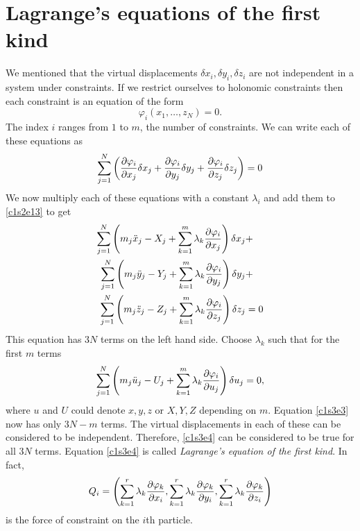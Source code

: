 \section{Lagrange's equations of the first kind}\label{c1s3}
We mentioned that the virtual displacements $\delta x_i, \delta y_i, 
\delta z_i$ are not 
independent in a system under constraints. If we restrict ourselves to
holonomic constraints then each constraint is an equation of the form
\begin{equation}\label{c1s3e1}
\varphi_i(x_1, \ldots, z_N) = 0.
\end{equation}
The index $i$ ranges from $1$ to $m$, the number of constraints. We can
write each of these equations as
\begin{equation}\label{c1s3e2}
\sum_{j=1}^{N}\left(\frac{\partial{\varphi_i}}{\partial{x_j}}\delta x_j 
+ \frac{\partial{\varphi_i}}{\partial{y_j}}\delta y_j
+ \frac{\partial{\varphi_i}}{\partial{z_j}}\delta z_j\right) = 0
\end{equation}
We now multiply each of these equations with a constant $\lambda_i$ and
add them to \eqref{c1s2e13} to get
\begin{align}
\sum_{j=1}^N \left(m_j\ddot{x}_j - X_j + 
\sum_{k=1}^m \lambda_k\frac{\partial{\varphi_i}}{\partial{x_j}} \right)\delta x_j & + \nonumber \\
\sum_{j=1}^N \left(m_j\ddot{y}_j - Y_j + 
\sum_{k=1}^m \lambda_k\frac{\partial{\varphi_i}}{\partial{y_j}} \right)\delta y_j & + \nonumber \\
\sum_{j=1}^N \left(m_j\ddot{z}_j - Z_j + 
\sum_{k=1}^m \lambda_k\frac{\partial{\varphi_i}}{\partial{z_j}} \right)\delta z_j & = 0 \label{c1s3e3}
\end{align}
This equation has $3N$ terms on the left hand side. Choose $\lambda_k$
such that for the first $m$ terms
\begin{equation}\label{c1s3e4}
\sum_{j=1}^N \left(m_j\ddot{u}_j - U_j + 
\sum_{k=1}^m \lambda_k\frac{\partial{\varphi_i}}{\partial{u_j}} \right)\delta u_j = 0,
\end{equation}
where $u$ and $U$ could denote $x, y, z$ or $X, Y, Z$ depending on $m$.
Equation \eqref{c1s3e3} now has only $3N - m$ terms. The virtual displacements
in each of these can be considered to be independent. Therefore, \eqref{c1s3e4}
can be considered to be true for all $3N$ terms. Equation \eqref{c1s3e4} is
called \emph{Lagrange's equation of the first kind}. In fact,
\begin{equation}
Q_i = \left(\sum_{k=1}^r\lambda_k \frac{\partial{\varphi_k}}{\partial{x_i}},
            \sum_{k=1}^r\lambda_k \frac{\partial{\varphi_k}}{\partial{y_i}},
            \sum_{k=1}^r\lambda_k \frac{\partial{\varphi_k}}{\partial{z_i}}\right)
\end{equation}
is the force of constraint on the $i$th particle.

